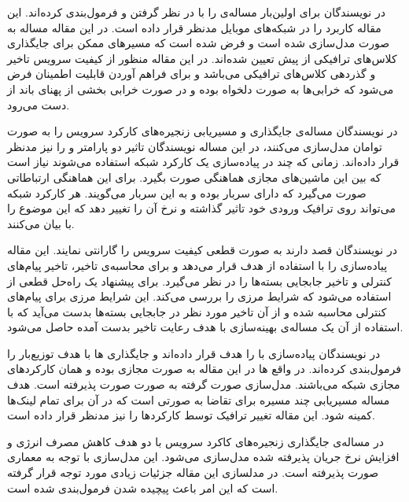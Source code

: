 در \cite{Yu2017}
نویسندگان برای اولین‌بار مساله‌ی  را
با در نظر گرفتن  و 
فرمول‌بندی کرده‌اند.
این مقاله کاربرد  را در شبکه‌های موبایل مدنظر قرار داده است.
در این مقاله مساله به صورت 
مدل‌سازی شده است و فرض شده است که مسیرهای ممکن برای جایگذاری کلاس‌های ترافیکی از پیش تعیین شده‌اند.
در این مقاله منظور از کیفیت سرویس تاخیر و گذردهی کلاس‌های ترافیکی می‌باشد و 
برای فراهم آوردن قابلیت اطمینان فرض می‌شود که خرابی‌ها به صورت دلخواه بوده و در صورت خرابی‌
بخشی از پهنای باند از دست می‌رود.


در \cite{Huang2017}
نویسندگان مساله‌ی جایگذاری و مسیریابی زنجیره‌های کارکرد سرویس را به صورت توامان مدل‌سازی می‌کنند،
در این مساله نویسندگان تاثیر دو پارامتر  و 
را نیز مدنظر قرار داده‌اند.
زمانی که چند  در پیاده‌سازی یک کارکرد شبکه استفاده می‌شوند
نیاز است که بین این ماشین‌های مجازی هماهنگی صورت بگیرد.
برای این هماهنگی ارتباطاتی صورت می‌گیرد که دارای سربار بوده و به این سربار
 می‌گویند.
هر کارکرد شبکه می‌تواند روی ترافیک ورودی خود تاثیر گذاشته و نرخ آن را تغییر دهد
که این موضوع را با  بیان می‌کنند.

در \cite{Chen2017}
نویسندگان قصد دارند به صورت قطعی کیفیت سرویس را گارانتی نمایند.
این مقاله پیاده‌سازی  را با استفاده از  هدف قرار می‌دهد
و برای محاسبه‌ی تاخیر، تاخیر پیام‌های کنترلی  و
تاخیر جابجایی بسته‌ها را در نظر می‌گیرد.
برای پیشنهاد یک راه‌حل قطعی از 
استفاده می‌شود که شرایط مرزی را بررسی می‌کند.
این شرایط مرزی برای پیام‌های کنترلی محاسبه شده
و از آن تاخیر مورد نظر در جابجایی بسته‌ها بدست می‌آید
که با استفاده از آن یک مساله‌ی بهینه‌سازی با هدف رعایت تاخیر بدست آمده حاصل می‌شود.

در \cite{Ma2017}
نویسندگان پیاده‌سازی  با 
را هدف قرار داده‌اند و جایگذاری ها
با هدف توزیع‌بار را فرمول‌بندی کرده‌اند.
در واقع ها
در این مقاله به صورت مجازی بوده و همان کارکردهای مجازی شبکه می‌باشند.
مدل‌سازی صورت گرفته به صورت  صورت پذیرفته است.
هدف مساله مسیریابی چند مسیره برای تقاضا به صورتی است که در آن
 برای تمام لینک‌ها کمینه شود.
این مقاله تغییر ترافیک توسط کارکردها را نیز مدنظر قرار داده است.

در \cite{Jang2017}
مساله‌ی جایگذاری زنجیره‌های کاکرد سرویس با دو هدف کاهش مصرف انرژی و افزایش نرخ جریان پذیرفته شده
مدل‌سازی می‌شود. این مدل‌سازی با توجه به معماری  صورت پذیرفته است.
در مدلسازی این مقاله جزئیات زیادی مورد توجه قرار گرفته است که این امر باعث پیچیده شدن
فرمول‌بندی شده است.

